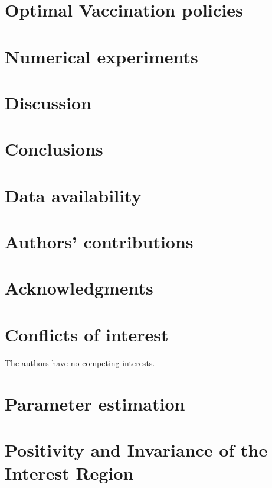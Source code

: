 \documentclass[3p, sort&compress]{elsarticle}
\begin{document}
    \section{Optimal Vaccination policies}
        \label{Sec:OptimalVaccinePolicies}
        
    \section{Numerical experiments}
        \label{Sec:NumericalExperiment}
        
    \section{Discussion}
        \label{Sec:Discussion}
        
    \section{Conclusions}
        
    \section*{Data availability}
        
    \section*{Authors’ contributions}
        
    \section*{Acknowledgments}
        
    \section*{Conflicts of interest}
        The authors have no competing interests.
    
    
    \appendix
    \section{Parameter estimation}
        
    \section{Positivity and Invariance of the Interest Region}
        \label{apx:positivity_invariace}
        
\end{document}
